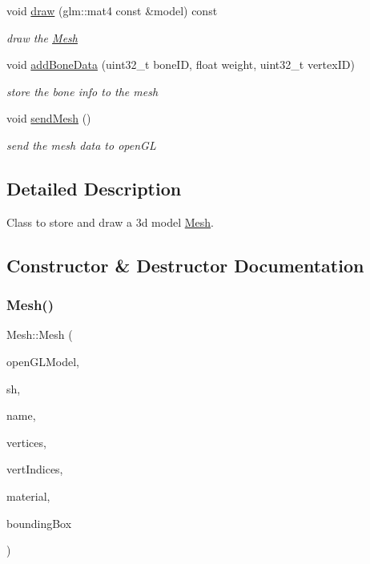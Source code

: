 \begin{DoxyCompactItemize}
\mbox{\label{class_mesh_a06496712e5436f307076bdd0ef05ea03}} 
void \hyperlink{class_mesh_a06496712e5436f307076bdd0ef05ea03}{draw} (glm\+::mat4 const \&model) const
\begin{DoxyCompactList}\small\item\em draw the \hyperlink{class_mesh}{Mesh} \end{DoxyCompactList}\item 
void \hyperlink{class_mesh_a9b6d06fc58f90869b8bf9a4d40177cc9}{add\+Bone\+Data} (uint32\+\_\+t bone\+ID, float weight, uint32\+\_\+t vertex\+ID)
\begin{DoxyCompactList}\small\item\em store the bone info to the mesh \end{DoxyCompactList}\item 
\mbox{\label{class_mesh_aa7f62a30fdb6aeca5d74fb01ec0a5c91}} 
void \hyperlink{class_mesh_aa7f62a30fdb6aeca5d74fb01ec0a5c91}{send\+Mesh} ()
\begin{DoxyCompactList}\small\item\em send the mesh data to open\+GL \end{DoxyCompactList}\end{DoxyCompactItemize}


\subsection{Detailed Description}
Class to store and draw a 3d model \hyperlink{class_mesh}{Mesh}. 

\subsection{Constructor \& Destructor Documentation}
\mbox{\label{class_mesh_a3acd2a5dec9fade334a7c37cf46a9962}} 
\subsubsection{\texorpdfstring{Mesh()}{Mesh()}\hspace{0.1cm}{\footnotesize\ttfamily [1/2]}}
{\footnotesize\ttfamily Mesh\+::\+Mesh (\begin{DoxyParamCaption}\item[{\hyperlink{class_open_g_l_model}{Open\+G\+L\+Model} \&}]{open\+G\+L\+Model,  }\item[{\hyperlink{class_shader}{Shader} \&}]{sh,  }\item[{std\+::string const \&}]{name,  }\item[{std\+::vector$<$ \hyperlink{struct_vertex}{Vertex} $>$}]{vertices,  }\item[{std\+::vector$<$ uint32\+\_\+t $>$}]{vert\+Indices,  }\item[{\hyperlink{class_material}{Material}}]{material,  }\item[{\hyperlink{struct_bounding_box}{Bounding\+Box}}]{bounding\+Box }\end{DoxyParamCaption})}



